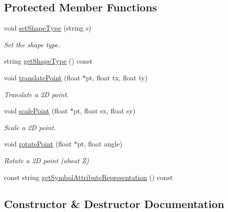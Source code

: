 \subsection*{Protected Member Functions}
\begin{DoxyCompactItemize}
\item 
void \hyperlink{classbridges_1_1datastructure_1_1_symbol_add56ff3bb5b276c016cfe377ff0f3fe2}{set\+Shape\+Type} (string s)
\begin{DoxyCompactList}\small\item\em Set the shape type. \end{DoxyCompactList}\item 
string \hyperlink{classbridges_1_1datastructure_1_1_symbol_a8f8378ed4009865611ce8b93e4432211}{get\+Shape\+Type} () const
\item 
void \hyperlink{classbridges_1_1datastructure_1_1_symbol_a3331549f82faa00d8fee5f51ca547cb0}{translate\+Point} (float $\ast$pt, float tx, float ty)
\begin{DoxyCompactList}\small\item\em Translate a 2D point. \end{DoxyCompactList}\item 
void \hyperlink{classbridges_1_1datastructure_1_1_symbol_ac27131f6461a763e55f1127f3cf87932}{scale\+Point} (float $\ast$pt, float sx, float sy)
\begin{DoxyCompactList}\small\item\em Scale a 2D point. \end{DoxyCompactList}\item 
void \hyperlink{classbridges_1_1datastructure_1_1_symbol_ad40678e04bae69b4c03881148678e71e}{rotate\+Point} (float $\ast$pt, float angle)
\begin{DoxyCompactList}\small\item\em Rotate a 2D point (about Z) \end{DoxyCompactList}\item 
const string \hyperlink{classbridges_1_1datastructure_1_1_symbol_ab9a92e73867a95e8cc3e63cad75d266a}{get\+Symbol\+Attribute\+Representation} () const
\end{DoxyCompactItemize}


\subsection{Constructor \& Destructor Documentation}
\mbox{\label{classbridges_1_1datastructure_1_1_symbol_a6169106c021d20752abba3cd266ecfb0}} 
